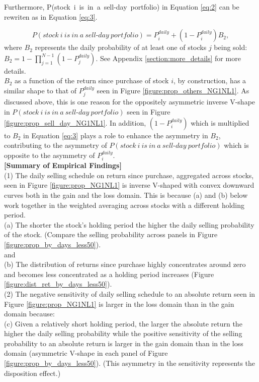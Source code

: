 \documentclass[11pt, a4paper]{article}
\begin{document}
Furthermore, P(stock~i~is~in~a~sell\mbox{-}day~portfolio) in Equation \ref{eq:2} can be rewriten as in Equation \ref{eq:3}. 

\begin{equation}
\label{eq:3}
P(stock~i~is~in~a~sell\mbox{-}day~portfolio) = P^{daily}_{i}+(1-P^{daily}_{i})B_2,
\end{equation}
where $B_2$ represents the daily probability of at least one of stocks $j$ being sold: $B_2 = 1-\prod_{j=1}^{N-1}(1-P^{daily}_{j})$. See Appendix \ref{section:more_details} for more details.\\

$B_2$ as a function of the return since purchase of stock $i$, by construction, has a similar shape to that of $P^{daily}_{j}$ seen in Figure \ref{figure:prop_others_NG1NL1}. As discussed above, this is one reason for the oppositely asymmetric inverse V-shape in $P(stock~i~is~in~a~sell\mbox{-}day~portfolio)$ seen in Figure \ref{figure:prop_sell_day_NG1NL1}.
In addition, $(1-P^{daily}_{i})$ which is multiplied to $B_2$ in Equation \ref{eq:3} plays a role to enhance the asymmetry in $B_2$, contributing to the asymmetry of $P(stock~i~is~in~a~sell\mbox{-}day~portfolio)$ which is opposite to the asymmetry of $P^{daily}_{i}$. \\




\noindent
\textbf{[Summary of Empirical Findings]}\\
\noindent
(1) The daily selling schedule on return since purchase, aggregated across stocks, seen in Figure \ref{figure:prop_NG1NL1} is inverse V-shaped with convex downward curves both in the gain and the loss domain. This is because (a) and (b) below work together in the weighted averaging across stocks with a different holding period.\\
\noindent
(a) The shorter the stock's holding period the higher the daily selling probability of the stock. (Compare the selling probability across panels in Figure \ref{figure:prop_by_days_less50}).\\
and\\
\noindent
(b) The distribution of returns since purchase highly concentrates around zero and becomes less concentrated as a holding period increases (Figure \ref{figure:dist_ret_by_days_less50}).\\

\noindent
(2) The negative sensitivity of daily selling schedule to an absolute return seen in Figure \ref{figure:prop_NG1NL1} is larger in the loss domain than in the gain domain because:\\
\noindent
(c) Given a relatively short holding period, the larger the absolute return the higher the daily selling probability while the positive sensitivity of the selling probability to an absolute return is larger in the gain domain than in the loss domain (asymmetric V-shape in each panel of Figure \ref{figure:prop_by_days_less50}). (This asymmetry in the sensitivity represents the disposition effect.)\\
\end{document}
